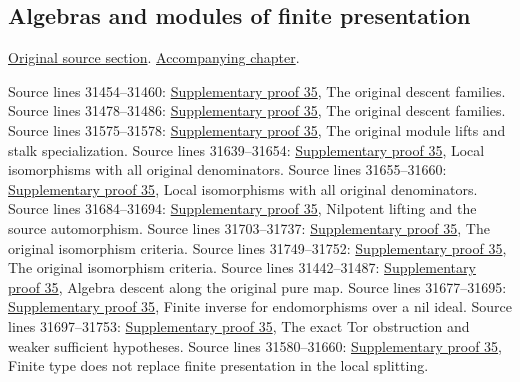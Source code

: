 \subsection{Algebras and modules of finite presentation}
\hypertarget{algebra-source-section-finite-presentation}{}
\noindent\href{https://github.com/stacks/stacks-project/blob/a04446e57ec1fbc252a871afcec7752fb2807b14/algebra.tex\#L31434}{Original source section}. \href{algebra.pdf\#nameddest=section-finite-presentation}{Accompanying chapter}.

\begin{AlgebraSourceRoutes}
 Source lines 31454--31460: \hyperlink{algebra_finite_presentation_notes_20260928}{Supplementary proof 35}, The original descent families.
 Source lines 31478--31486: \hyperlink{algebra_finite_presentation_notes_20260928}{Supplementary proof 35}, The original descent families.
 Source lines 31575--31578: \hyperlink{algebra_finite_presentation_notes_20260928}{Supplementary proof 35}, The original module lifts and stalk specialization.
 Source lines 31639--31654: \hyperlink{algebra_finite_presentation_notes_20260928}{Supplementary proof 35}, Local isomorphisms with all original denominators.
 Source lines 31655--31660: \hyperlink{algebra_finite_presentation_notes_20260928}{Supplementary proof 35}, Local isomorphisms with all original denominators.
 Source lines 31684--31694: \hyperlink{algebra_finite_presentation_notes_20260928}{Supplementary proof 35}, Nilpotent lifting and the source automorphism.
 Source lines 31703--31737: \hyperlink{algebra_finite_presentation_notes_20260928}{Supplementary proof 35}, The original isomorphism criteria.
 Source lines 31749--31752: \hyperlink{algebra_finite_presentation_notes_20260928}{Supplementary proof 35}, The original isomorphism criteria.
 Source lines 31442--31487: \hyperlink{algebra_finite_presentation_notes_20260928}{Supplementary proof 35}, Algebra descent along the original pure map.
 Source lines 31677--31695: \hyperlink{algebra_finite_presentation_notes_20260928}{Supplementary proof 35}, Finite inverse for endomorphisms over a nil ideal.
 Source lines 31697--31753: \hyperlink{algebra_finite_presentation_notes_20260928}{Supplementary proof 35}, The exact Tor obstruction and weaker sufficient hypotheses.
 Source lines 31580--31660: \hyperlink{algebra_finite_presentation_notes_20260928}{Supplementary proof 35}, Finite type does not replace finite presentation in the local splitting.
\end{AlgebraSourceRoutes}

